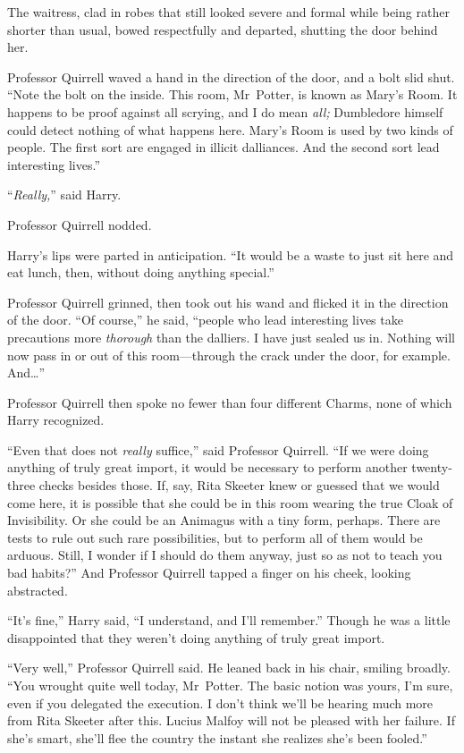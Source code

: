 The waitress, clad in robes that still looked severe and formal while being rather shorter than usual, bowed respectfully and departed, shutting the door behind her.

Professor Quirrell waved a hand in the direction of the door, and a bolt slid shut. “Note the bolt on the inside. This room, Mr~Potter, is known as Mary’s Room. It happens to be proof against all scrying, and I do mean \emph{all;} Dumbledore himself could detect nothing of what happens here. Mary’s Room is used by two kinds of people. The first sort are engaged in illicit dalliances. And the second sort lead interesting lives.”

“\emph{Really,}” said Harry.

Professor Quirrell nodded.

Harry’s lips were parted in anticipation. “It would be a waste to just sit here and eat lunch, then, without doing anything special.”

Professor Quirrell grinned, then took out his wand and flicked it in the direction of the door. “Of course,” he said, “people who lead interesting lives take precautions more \emph{thorough} than the dalliers. I have just sealed us in. Nothing will now pass in or out of this room—through the crack under the door, for example. And…”

Professor Quirrell then spoke no fewer than four different Charms, none of which Harry recognized.

“Even that does not \emph{really} suffice,” said Professor Quirrell. “If we were doing anything of truly great import, it would be necessary to perform another twenty-three checks besides those. If, say, Rita Skeeter knew or guessed that we would come here, it is possible that she could be in this room wearing the true Cloak of Invisibility. Or she could be an Animagus with a tiny form, perhaps. There are tests to rule out such rare possibilities, but to perform all of them would be arduous. Still, I wonder if I should do them anyway, just so as not to teach you bad habits?” And Professor Quirrell tapped a finger on his cheek, looking abstracted.

“It’s fine,” Harry said, “I understand, and I’ll remember.” Though he was a little disappointed that they weren’t doing anything of truly great import.

“Very well,” Professor Quirrell said. He leaned back in his chair, smiling broadly. “You wrought quite well today, Mr~Potter. The basic notion was yours, I’m sure, even if you delegated the execution. I don’t think we’ll be hearing much more from Rita Skeeter after this. Lucius Malfoy will not be pleased with her failure. If she’s smart, she’ll flee the country the instant she realizes she’s been fooled.”

